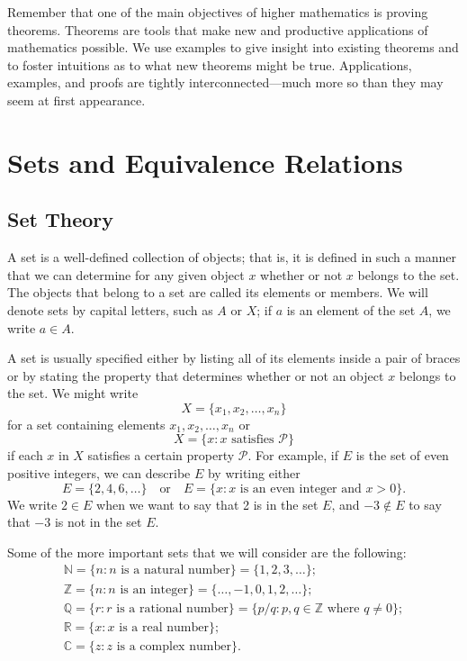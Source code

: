 Remember that one of the main objectives of higher mathematics is proving theorems. Theorems are tools that make new and productive applications of mathematics possible.  We use examples to give insight  into existing theorems and to foster intuitions as to what new theorems might be true.  Applications, examples, and proofs are tightly interconnected---much more so than they may seem at first appearance.
 
 
\section{Sets and Equivalence Relations}
 
 
\subsection*{Set Theory}
 
A {\bfi set\/} is a well-defined collection of objects; that is, it is defined in such a manner that we can determine for any given object $x$ whether or not $x$ belongs to the set.  The objects that belong to a set are called its {\bfi elements} or {\bfi members}. We will denote sets by capital letters, such as $A$ or $X$; if $a$ is an element of the set $A$, we write $a \in A$\label{sets_membership}.

A set is usually specified either by listing all of its elements inside a pair of braces or by stating the property that determines whether or not an object $x$ belongs to the set. We might write
\[
X = \{ x_1, x_2, \ldots, x_n \}
\]
for a set containing elements $x_1, x_2, \ldots, x_n$ or
\[
X = \{ x :x \text{ satisfies }{\mathcal P}\}
\]
if each $x$ in $X$ satisfies a certain property ${\mathcal P}$.  For example, if $E$ is the set of even positive integers, we can describe $E$ by writing either 
\[
E = \{2, 4, 6, \ldots \}
\quad \text{or} \quad
E = \{ x : x \text{ is an even integer and } x > 0 \}.
\]
We write $2 \in E$ when we want to say that 2 is in the set $E$, and $-3 \notin E$ to say that $-3$ is not in the set $E$.

Some of the more important sets that we will consider are the following: 
\begin{gather*}
{\mathbb N}\label{naturalnum}  = \{n: n \text{ is a natural number}\}  = \{1, 2, 3, \ldots \}; \\
{\mathbb Z}\label{sets_integers}  = \{n : n \text{ is an integer} \} = \{\ldots, -1, 0, 1,  2, \ldots \} ; \\
{\mathbb Q}\label{rationals} = \{r : r \text{ is a rational number}\} = \{p/q : p, q \in {\mathbb Z} \text{ where } q \neq 0\}; \\
{\mathbb R}\label{reals} = \{ x : x \text{ is a real number} \}; \\
{\mathbb C}\label{complexnum} = \{z : z \text{ is a complex number}\}.
\end{gather*}

